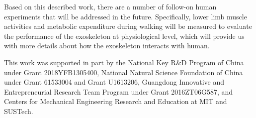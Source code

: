 \documentclass[twocolumn,cleanfoot,10pt]{asme2ej}
\begin{document}
Based on this described work, there are a number of follow-on human experiments that will be addressed in the future.
Specifically, lower limb muscle activities and metabolic expenditure during walking will be measured to evaluate the performance of the exoskeleton at physiological level, which will provide us with more details about how the exoskeleton interacts with human.

\begin{acknowledgment}
This work was supported in part by the National Key R\&D Program of China under Grant 2018YFB1305400, National Natural Science Foundation of China under Grant 61533004 and Grant U1613206, Guangdong Innovative and Entrepreneurial Research Team Program under Grant 2016ZT06G587, and Centers for Mechanical Engineering Research and Education at MIT and SUSTech.
\end{acknowledgment}

%



%


\clearpage
\listoffigures
\clearpage
\listoftables
\end{document}
